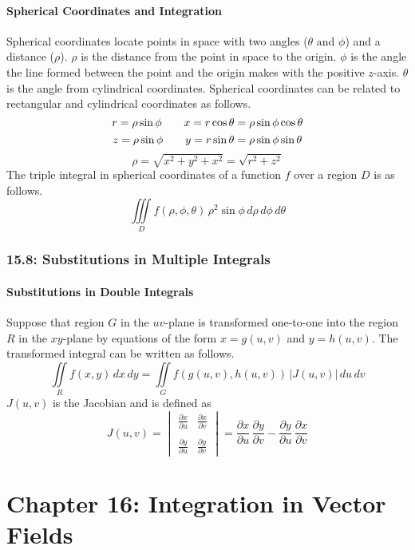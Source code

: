 \documentclass{article}
\begin{document}
\subsection*{Spherical Coordinates and Integration}
Spherical coordinates locate points in space with two angles (\(\theta \text{ and } \phi\)) and a distance (\(\rho\)). \(\rho\) is the distance from the point in space to the origin. \(\phi\) is the angle the line formed between the point and the origin makes with the positive \(z\)-axis. \(\theta\) is the angle from cylindrical coordinates. Spherical coordinates can be related to rectangular and cylindrical coordinates as follows.
\[r=\rho\sin\phi\hspace{7 mm}x=r\cos\theta=\rho\sin\phi\cos\theta\]
\[z=\rho\sin\phi\hspace{7 mm}y=r\sin\theta=\rho\sin\phi\sin\theta\]
\[\rho=\sqrt{x^2+y^2+x^2}=\sqrt{r^2+z^2}\]
The triple integral in spherical coordinates of a function \(f\) over a region \(D\) is as follows.
\[\iiint\limits_Df(\rho,\phi,\theta)\,\rho^2\sin\phi\,d\rho\,d\phi\,d\theta\]
\section*{15.8: Substitutions in Multiple Integrals}
\subsection*{Substitutions in Double Integrals}
Suppose that region \(G\) in the \(uv\)-plane is transformed one-to-one into the region \(R\) in the \(xy\)-plane by equations of the form \(x=g(u,v)\) and \(y=h(u,v)\). The transformed integral can be written as follows.
\[\iint\limits_Rf(x,y)\,dx\,dy=\iint\limits_Gf(g(u,v),h(u,v))\,|J(u,v)|\,du\,dv\]
\(J(u, v)\) is the Jacobian and is defined as
\[J(u,v)=\begin{vmatrix}
\frac{\partial x}{\partial u} & \frac{\partial x}{\partial v}\\\\
\frac{\partial y}{\partial u} & \frac{\partial y}{\partial v}
\end{vmatrix}=\frac{\partial x}{\partial u}\,\frac{\partial y}{\partial v}-\frac{\partial y}{\partial u}\,\frac{\partial x}{\partial v}\]
\part*{Chapter 16: Integration in Vector Fields}
\end{document}
